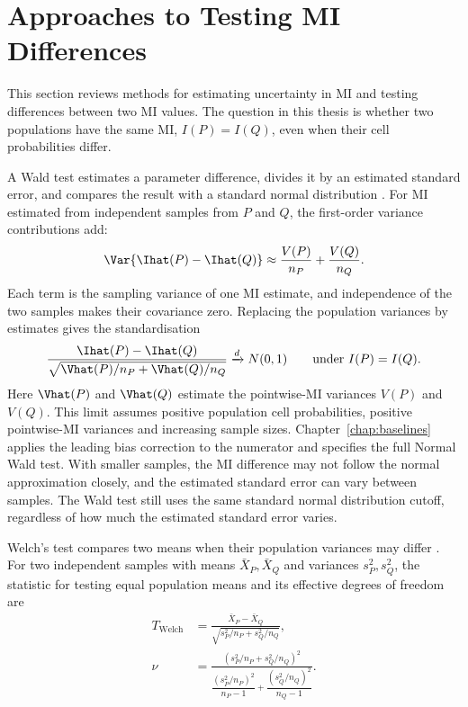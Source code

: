 \section{Approaches to Testing MI Differences}
\label{sec:welch-background}

This section reviews methods for estimating uncertainty in MI and testing
differences between two MI values. The question in this thesis is whether two
populations have the same MI, \(I(P)=I(Q)\), even when their cell
probabilities differ.


A Wald test estimates a parameter difference, divides it by an estimated
standard error, and compares the result with a standard normal distribution
\citep{wald1943,vanderVaart1998}.
For MI estimated from independent samples from \(P\) and \(Q\), the
first-order variance contributions add:
\begin{equation}
  \Var\{\Ihat(P)-\Ihat(Q)\}
  \approx \frac{V(P)}{n_P}+\frac{V(Q)}{n_Q}.
  \label{eq:background-two-sample-variance}
\end{equation}
Each term is the sampling variance of one MI estimate, and independence of
the two samples makes their covariance zero. Replacing the population variances
by estimates gives the standardisation
\begin{equation}
  \frac{\Ihat(P)-\Ihat(Q)}
       {\sqrt{\Vhat(P)/n_P+\Vhat(Q)/n_Q}}
  \xrightarrow{d}N(0,1)
  \qquad\text{under }I(P)=I(Q).
  \label{eq:background-wald-standardisation}
\end{equation}
Here \(\Vhat(P)\) and \(\Vhat(Q)\) estimate the pointwise-MI variances
\(V(P)\) and \(V(Q)\). This limit assumes positive population cell
probabilities, positive pointwise-MI variances and increasing sample
sizes. Chapter~\ref{chap:baselines} applies the leading bias correction
to the numerator and specifies the full Normal Wald test.
With smaller samples, the MI difference may not follow the normal
approximation closely, and the estimated standard error can vary between
samples. The Wald test still uses the same standard normal distribution
cutoff, regardless of how much the estimated standard error varies.

\medskip
{}

Welch's test compares two means when their population variances may differ
\citep{welch1947}. For two independent samples with means
\(\bar X_P,\bar X_Q\) and variances \(s_P^2,s_Q^2\), the statistic for
testing equal population means and its effective degrees of freedom are
\begin{align}
  T_{\mathrm{Welch}}
  &=\frac{\bar X_P-\bar X_Q}
          {\sqrt{s_P^2/n_P+s_Q^2/n_Q}},\\
  \nu
  &=\frac{\left(s_P^2/n_P+s_Q^2/n_Q\right)^2}
          {\dfrac{(s_P^2/n_P)^2}{n_P-1}
           +\dfrac{(s_Q^2/n_Q)^2}{n_Q-1}}.
  \label{eq:background-ordinary-welch}
\end{align}

